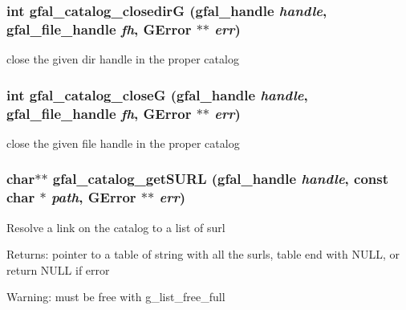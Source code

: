 \subsubsection{\setlength{\rightskip}{0pt plus 5cm}int gfal\_\-catalog\_\-closedir\-G (gfal\_\-handle {\em handle}, gfal\_\-file\_\-handle {\em fh}, GError $\ast$$\ast$ {\em err})}\label{gfal__common__catalog_8h_348fe15690faed2e2731d15eb6cc7856}


close the given dir handle in the proper catalog 
\subsubsection{\setlength{\rightskip}{0pt plus 5cm}int gfal\_\-catalog\_\-close\-G (gfal\_\-handle {\em handle}, gfal\_\-file\_\-handle {\em fh}, GError $\ast$$\ast$ {\em err})}\label{gfal__common__catalog_8h_27712f4ef0fd4a8d3d5b63b90936d295}


close the given file handle in the proper catalog 
\subsubsection{\setlength{\rightskip}{0pt plus 5cm}char$\ast$$\ast$ gfal\_\-catalog\_\-get\-SURL (gfal\_\-handle {\em handle}, const char $\ast$ {\em path}, GError $\ast$$\ast$ {\em err})}\label{gfal__common__catalog_8h_eeef83dd1c788197ed7ae4a933d8e8d3}


Resolve a link on the catalog to a list of surl \begin{Desc}
\item[Returns:]pointer to a table of string with all the surls, table end with NULL, or return NULL if error \end{Desc}
\begin{Desc}
\item[Warning:]must be free with g\_\-list\_\-free\_\-full \end{Desc}
